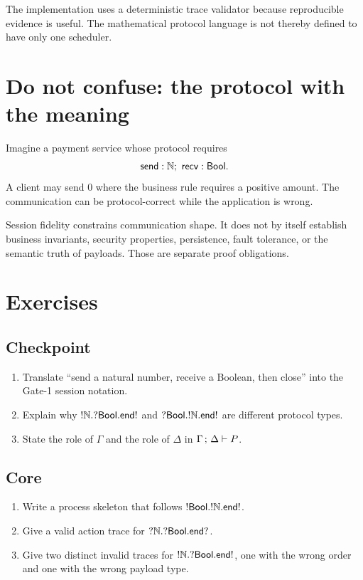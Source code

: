 The implementation uses a deterministic trace validator because reproducible evidence is useful.
The mathematical protocol language is not thereby defined to have only one scheduler.

\section{Do not confuse: the protocol with the meaning}

Imagine a payment service whose protocol requires
\[
  \mathsf{send}:\Nat;\ \mathsf{recv}:\Bool.
\]
A client may send \(0\) where the business rule requires a positive amount. The communication can
be protocol-correct while the application is wrong.

\begin{warningbox}
Session fidelity constrains communication shape. It does not by itself establish business
invariants, security properties, persistence, fault tolerance, or the semantic truth of payloads.
Those are separate proof obligations.
\end{warningbox}

\section{Exercises}

\subsection*{Checkpoint}
\begin{enumerate}[label=\textbf{1.\arabic*}]
\item Translate ``send a natural number, receive a Boolean, then close'' into the Gate-1 session notation.
\item Explain why \(!\mathbb{N}.?\mathsf{Bool}.\mathsf{end!}\) and
\(?\mathsf{Bool}.!\mathbb{N}.\mathsf{end!}\) are different protocol types.
\item State the role of \(\Gamma\) and the role of \(\Delta\) in
\(\Gamma\,;\,\Delta \vdash P\).
\end{enumerate}

\subsection*{Core}
\begin{enumerate}[label=\textbf{1.\arabic*},start=4]
\item Write a process skeleton that follows
\(!\mathsf{Bool}.!\mathbb{N}.\mathsf{end!}\).
\item Give a valid action trace for
\(?\mathbb{N}.?\mathsf{Bool}.\mathsf{end?}\).
\item Give two distinct invalid traces for
\(!\mathbb{N}.?\mathsf{Bool}.\mathsf{end!}\), one with the wrong order and one with the wrong payload type.
\end{enumerate}

